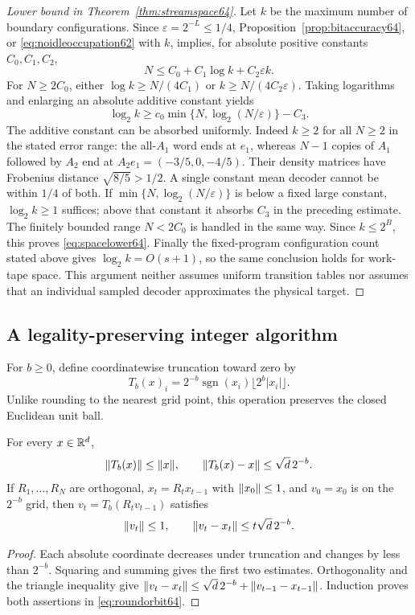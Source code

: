 \begin{proof}[Lower bound in Theorem~\ref{thm:streamspace64}]
Let $k$ be the maximum number of boundary configurations. Since
$\varepsilon=2^{-L}\le1/4$, Proposition~\ref{prop:bitaccuracy64}, or
\eqref{eq:noidleoccupation62} with $k$, implies, for absolute positive
constants $C_0,C_1,C_2$,
\begin{equation}\label{eq:bitdichotomy64}
 N\le C_0+C_1\log k+C_2\varepsilon k.
\end{equation}
For $N\ge2C_0$, either $\log k\ge N/(4C_1)$ or
$k\ge N/(4C_2\varepsilon)$. Taking logarithms and enlarging an
absolute additive constant yields
\[
 \log_2 k\ge c_0\min\{N,\log_2(N/\varepsilon)\}-C_3.
\]
The additive constant can be absorbed uniformly. Indeed $k\ge2$ for
all $N\ge2$ in the stated error range: the all-$A_1$ word ends at
$e_1$, whereas $N-1$ copies of $A_1$ followed by $A_2$ end at
$A_2e_1=(-3/5,0,-4/5)$. Their density matrices have Frobenius
distance $\sqrt{8/5}>1/2$. A single constant mean decoder cannot be
within $1/4$ of both. If
$\min\{N,\log_2(N/\varepsilon)\}$ is below a fixed large constant,
$\log_2k\ge1$ suffices; above that constant it absorbs $C_3$ in the
preceding estimate. The finitely bounded range $N<2C_0$ is handled
in the same way. Since $k\le2^B$, this proves
\eqref{eq:spacelower64}. Finally the fixed-program configuration count
stated above gives $\log_2k=O(s+1)$, so the same conclusion holds
for work-tape space. This argument neither assumes uniform transition
tables nor assumes that an individual sampled decoder approximates
the physical target.
\end{proof}

\subsection{A legality-preserving integer algorithm}
For $b\ge0$, define coordinatewise truncation toward zero by
\[
 T_b(x)_i=2^{-b}\operatorname{sgn}(x_i)
                          \lfloor2^b|x_i|\rfloor.
\]
Unlike rounding to the nearest grid point, this operation preserves
the closed Euclidean unit ball.
\begin{lemma}\label{lem:directedround64}
For every $x\in\mathbb R^d$,
\[
 \lVert T_b(x)\rVert\le\lVert x\rVert,\qquad
 \lVert T_b(x)-x\rVert\le\sqrt d\,2^{-b}.
\]
If $R_1,\ldots,R_N$ are orthogonal, $x_t=R_tx_{t-1}$ with
$\lVert x_0\rVert\le1$, and $v_0=x_0$ is on the $2^{-b}$ grid, then
$v_t=T_b(R_tv_{t-1})$ satisfies
\begin{equation}\label{eq:roundorbit64}
 \lVert v_t\rVert\le1,\qquad \lVert v_t-x_t\rVert\le t\sqrt d\,2^{-b}.
\end{equation}
\end{lemma}
\begin{proof}
Each absolute coordinate decreases under truncation and changes by
less than $2^{-b}$. Squaring and summing gives the first two estimates.
Orthogonality and the triangle inequality give
$\lVert v_t-x_t\rVert\le\sqrt d\,2^{-b}+\lVert v_{t-1}-x_{t-1}\rVert$.
Induction proves both assertions in \eqref{eq:roundorbit64}.
\end{proof}

